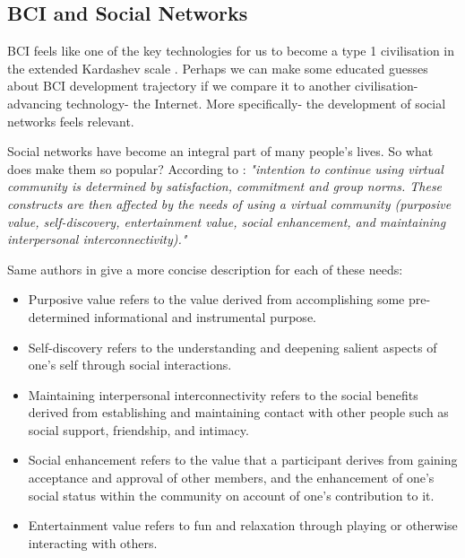 \documentclass[fleqn,11pt]{olplainarticle}
\begin{document}
\subsection{BCI and Social Networks}
BCI feels like one of the key technologies for us to become a type 1 civilisation in the extended Kardashev scale \cite{gray2020extended}. Perhaps we can make some educated guesses about BCI development trajectory if we compare it to another civilisation-advancing technology- the Internet. More specifically- the development of social networks feels relevant.

Social networks have become an integral part of many people's lives. So what does make them so popular? According to \cite{cheung2009understanding}: \textit{"intention to continue using virtual community is determined by satisfaction, commitment and group norms. These constructs are then affected by the needs of using a virtual community (purposive value, self-discovery, entertainment value, social enhancement, and maintaining interpersonal interconnectivity)."}

Same authors in \cite{cheung2011online} give a more concise description for each of these needs: 
\begin{displayquote}
    \begin{itemize}
        \item Purposive value refers to the value derived from accomplishing some pre-determined informational and instrumental purpose.
        \item Self-discovery refers to the understanding and deepening salient aspects of one’s self through social interactions.
        \item Maintaining interpersonal interconnectivity refers to the social benefits derived from establishing and maintaining contact with other people such as social support, friendship, and intimacy.
        \item Social enhancement refers to the value that a participant derives from gaining acceptance and approval of other members, and the enhancement of one’s social status within the community on account of one’s contribution to it.
        \item Entertainment value refers to fun and relaxation through playing or otherwise interacting with others.
    \end{itemize}
\end{displayquote}
\end{document}
